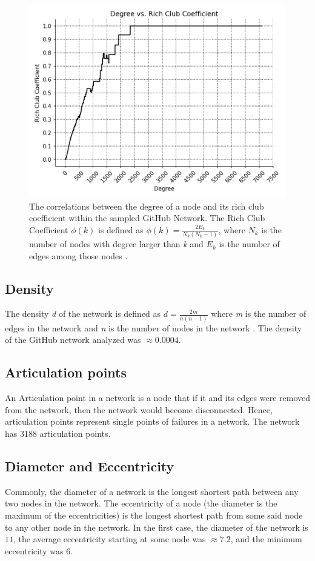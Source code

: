 \documentclass[9pt,twocolumn,twoside]{pnas-new}
\begin{document}
\begin{figure}
\centering
\includegraphics[width=.8\linewidth]{rich_club_coefficients}
\caption{The correlations between the degree of a node and its rich club coefficient within the sampled GitHub Network. The Rich Club Coefficient $\phi(k)$ is defined as $\phi(k)=\frac{2E_{k}}{N_{k}(N_{k} - 1)}$, where $N_{k}$ is the number of nodes with degree larger than \textit{k} and $E_{k}$ is the number of edges among those nodes \cite{networkxrichclubcoefficients}.
}
\label{fig:rich_club_coefficients}
\end{figure}

\subsection{Density} The density \textit{d} of the network is defined as
$d = \frac{2m}{n(n-1)}$
where \textit{m} is the number of edges in the network and \textit{n} is the number of nodes in the network \cite{networkxdensity}. The density of the GitHub network analyzed was $\approx 0.0004$.

\subsection{Articulation points} An Articulation point in a network is a node that if it and its edges were removed from the network, then the network would become disconnected. Hence, articulation points represent single points of failures in a network. The network has 3188 articulation points.

\subsection{Diameter and Eccentricity} Commonly, the diameter of a network is the longest shortest path between any two nodes in the network. The eccentricity of a node (the diameter is the maximum of the eccentricities) is the longest shortest path from some said node to any other node in the network. In the first case, the diameter of the network is $11$, the average eccentricity starting at some node was $\approx 7.2$, and the minimum eccentricity was $6$.
\end{document}
